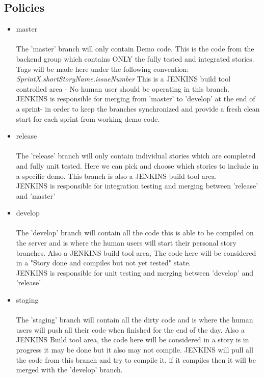 \documentclass[11pt]{report}
\begin{document}
\subsection {Policies}
\begin{itemize}
\item master\\ \\
The 'master' branch will only contain Demo code. This is the code from the backend group which contains ONLY the fully tested and integrated stories.  \\Tags will be made here under the following convention:\\ \emph{SprintX.shortStoryName.issueNumber}\newpage
This is a JENKINS build tool controlled area - No human user should be operating in this branch. \\JENKINS is responsible for  merging from 'master' to 'develop' at the end of a sprint- in order to keep the branches synchronized and provide a fresh clean start for each sprint from working demo code.\\
\item release\\ \\
The 'release' branch will only contain individual stories which are completed and fully unit tested. Here we can pick and choose which stories to include in a specific demo. This branch is also a JENKINS build tool area. \\JENKINS is responsible for integration testing and merging between 'release' and 'master'
\item develop\\ \\
The 'develop' branch will contain all the code this is able to be compiled on the server and is where the human users will start their personal story branches. Also a JENKINS build tool area, The code here will be considered in a "Story done and compiles but not yet tested" state.\\ JENKINS is responsible for unit testing and merging between 'develop' and 'release'

\item staging \\ \\
The 'staging' branch will contain all the dirty code and is where the human users will push all their code when finished for the end of the day. Also a JENKINS Build tool area, the code here will be considered in a story is in progress it may be done but it also may not compile. JENKINS will pull all the code from this branch and try to compile it, if it compiles then it will be merged with the 'develop' branch.


\end{itemize}
\end{document}
